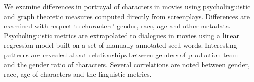 We examine differences in portrayal of characters in movies using psycholinguistic and graph theoretic measures computed directly from screenplays. Differences are examined with respect to characters' gender, race, age and other metadata. Psycholinguistic metrics are extrapolated to dialogues in movies using a linear regression model built on a set of manually annotated seed words. Interesting patterns are revealed about relationships between genders of production team and the gender ratio of characters. Several correlations are noted between gender, race, age of characters and the linguistic metrics.
